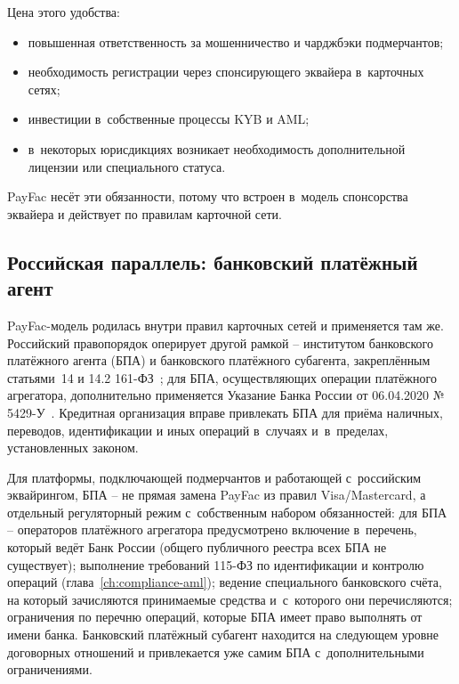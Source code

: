 Цена этого удобства:
\begin{itemize}
  \item повышенная ответственность за мошенничество и чарджбэки
    подмерчантов;
  \item необходимость регистрации через спонсирующего эквайера
    в~карточных сетях;
  \item инвестиции в~собственные процессы KYB и AML;
  \item в~некоторых юрисдикциях возникает необходимость дополнительной
    лицензии или специального статуса.
\end{itemize}

PayFac несёт эти обязанности, потому что встроен в~модель спонсорства
эквайера и действует по правилам карточной
сети.~\cite{visa-acceptance-entities,visa-payment-facilitator-marketplace-risk-guide}


\subsection*{Российская параллель: банковский платёжный агент}

PayFac-модель родилась внутри правил карточных сетей и применяется
там же. Российский правопорядок оперирует другой рамкой --
институтом банковского платёжного агента (БПА) и банковского
платёжного субагента, закреплённым статьями~14 и 14.2
161-ФЗ~\cite{fz-161}; для БПА, осуществляющих операции платёжного
агрегатора, дополнительно применяется Указание Банка России от
06.04.2020 № 5429-У~\cite{cbr-5429u}. Кредитная организация вправе
привлекать БПА для приёма наличных, переводов, идентификации и
иных операций в~случаях и~в~пределах, установленных законом.

Для платформы, подключающей подмерчантов и работающей с~российским
эквайрингом, БПА -- не прямая замена PayFac из правил Visa/Mastercard,
а отдельный регуляторный режим с~собственным набором обязанностей:
для БПА -- операторов платёжного агрегатора предусмотрено включение
в~перечень, который ведёт Банк России (общего публичного реестра
всех БПА не существует); выполнение требований 115-ФЗ по
идентификации и контролю операций (глава~\ref{ch:compliance-aml});
ведение специального банковского счёта, на который зачисляются
принимаемые средства и~с~которого они перечисляются; ограничения
по перечню операций, которые БПА имеет право выполнять от имени
банка. Банковский платёжный субагент находится на следующем уровне
договорных отношений и привлекается уже самим БПА с~дополнительными
ограничениями.

